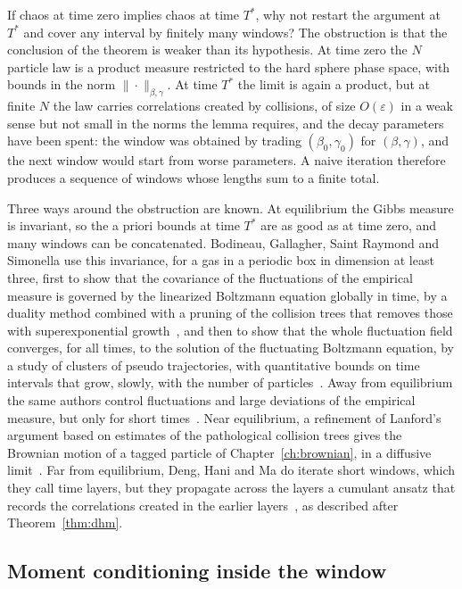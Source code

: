 If chaos at time zero implies chaos at time $T^*$, why not restart the argument at $T^*$ and cover any interval by finitely many windows? The obstruction is that the conclusion of the theorem is weaker than its hypothesis. At time zero the $N$ particle law is a product measure restricted to the hard sphere phase space, with bounds in the norm $\|\cdot\|_{\beta,\gamma}$. At time $T^*$ the limit is again a product, but at finite $N$ the law carries correlations created by collisions, of size $O(\varepsilon)$ in a weak sense but not small in the norms the lemma requires, and the decay parameters have been spent: the window was obtained by trading $(\beta_0,\gamma_0)$ for $(\beta,\gamma)$, and the next window would start from worse parameters. A naive iteration therefore produces a sequence of windows whose lengths sum to a finite total.

Three ways around the obstruction are known. At equilibrium the Gibbs measure is invariant, so the a priori bounds at time $T^*$ are as good as at time zero, and many windows can be concatenated. Bodineau, Gallagher, Saint Raymond and Simonella use this invariance, for a gas in a periodic box in dimension at least three, first to show that the covariance of the fluctuations of the empirical measure is governed by the linearized Boltzmann equation globally in time, by a duality method combined with a pruning of the collision trees that removes those with superexponential growth~\cite{bgss2023cpam}, and then to show that the whole fluctuation field converges, for all times, to the solution of the fluctuating Boltzmann equation, by a study of clusters of pseudo trajectories, with quantitative bounds on time intervals that grow, slowly, with the number of particles~\cite{bgss2024}. Away from equilibrium the same authors control fluctuations and large deviations of the empirical measure, but only for short times~\cite{bgss2023}. Near equilibrium, a refinement of Lanford's argument based on estimates of the pathological collision trees gives the Brownian motion of a tagged particle of Chapter~\ref{ch:brownian}, in a diffusive limit~\cite{bgs2016}. Far from equilibrium, Deng, Hani and Ma do iterate short windows, which they call time layers, but they propagate across the layers a cumulant ansatz that records the correlations created in the earlier layers~\cite{denghanima2024}, as described after Theorem~\ref{thm:dhm}.

\subsection{Moment conditioning inside the window}

